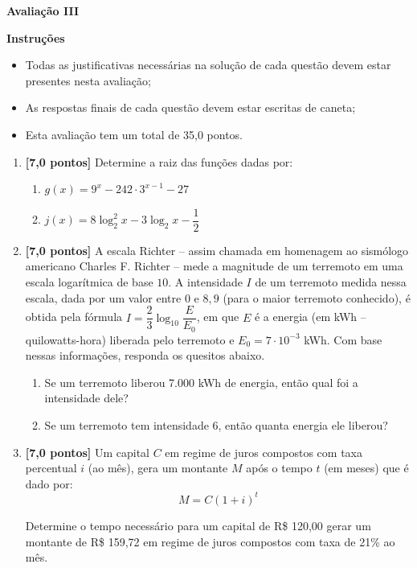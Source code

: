 \documentclass[12pt,a4paper]{article}
\begin{document}
\begin{center}
 \textbf{Avaliação III}
\end{center}

\textbf{Instruções}
\begin{itemize}
 \item Todas as justificativas necessárias na solução de cada questão devem estar presentes nesta avaliação;
 \item As respostas finais de cada questão devem estar escritas de caneta;
 \item Esta avaliação tem um total de 35,0 pontos.
\end{itemize}

\begin{enumerate}
  \item \textbf{[7,0 pontos]} Determine a raiz das funções dadas por:
    \begin{enumerate}
      \item $g(x) = 9^x - 242\cdot 3^{x-1} - 27$
      \item $j(x) = 8\log_2^2 x - 3\log_2 x - \dfrac{1}{2}$
    \end{enumerate}
  
  \item \textbf{[7,0 pontos]} A escala Richter -- assim chamada em homenagem ao sismólogo americano
  Charles F. Richter -- mede a magnitude de um terremoto em uma escala logarítmica
  de base $10$. A intensidade $I$ de um terremoto medida nessa escala, dada por um
  valor entre $0$ e $8,9$ (para o maior terremoto conhecido), é obtida pela
  fórmula $I=\dfrac{2}{3}\log_{10}\dfrac{E}{E_{0}}$, em que $E$ é a energia
  (em kWh -- quilowatts-hora) liberada pelo terremoto e $E_{0}=7\cdot10^{-3}$ kWh.
  Com base nessas informações, responda os quesitos abaixo.
    \begin{enumerate}
      \item Se um terremoto liberou 7.000 kWh de energia, então qual foi a intensidade dele?
      \item Se um terremoto tem intensidade $6$, então quanta energia ele liberou?
    \end{enumerate}
  
  \item \textbf{[7,0 pontos]} Um capital $C$ em regime de juros compostos com 
  taxa percentual $i$ (ao mês), gera um montante $M$ após o tempo $t$ (em meses) que é dado por:
  $$M = C(1 + i)^t$$

  Determine o tempo necessário para um capital de R\$ 120,00 gerar um montante
  de R\$ 159,72 em regime de juros compostos com taxa de 21\% ao mês.
  

\end{enumerate}
\end{document}
